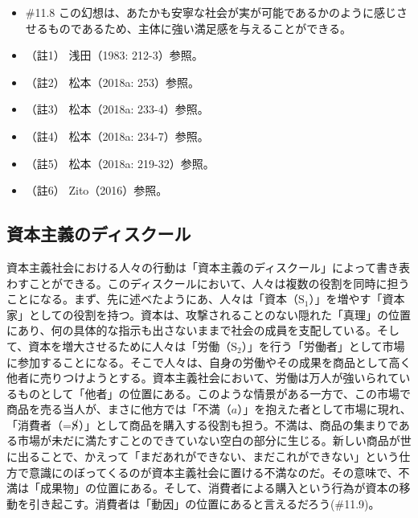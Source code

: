 \begin{note}{}
  \begin{itemize}
    \tightlist
    \item{\#11.8}
      この幻想は、あたかも安寧な社会が実が可能であるかのように感じさせるものであるため、主体に強い満足感を与えることができる。
  \end{itemize}
\end{note}

\begin{itemize}
\tightlist
\item
  （註1） 浅田（1983: 212-3）\cite{Asada}参照。
\item
  （註2） 松本（2018a: 253）\cite{Matsumoto1}参照。
\item
  （註3） 松本（2018a: 233-4）\cite{Matsumoto1}参照。
\item
  （註4） 松本（2018a: 234-7）\cite{Matsumoto1}参照。
\item
  （註5） 松本（2018a: 219-32）\cite{Matsumoto1}参照。
\item
  （註6） Zito（2016）\cite{Zito}参照。
\end{itemize}

\subsection{資本主義のディスクール}\label{ux8cc7ux672cux4e3bux7fa9ux306eux30c7ux30a3ux30b9ux30afux30fcux30eb}

資本主義社会における人々の行動は「\mbox{資本主義のディスクール}」によって書き表わすことができる。このディスクールにおいて、人々は複数の役割を同時に担うことになる。まず、先に述べたようにあ、人々は「資本（\(\textrm{S}_1\)）」を増やす「資本家」としての役割を持つ。資本は、攻撃されることのない隠れた「真理」の位置にあり、何の具体的な指示も出さないままで社会の成員を支配している。そして、資本を増大させるために人々は「労働（\(\textrm{S}_2\)）」を行う「労働者」として市場に参加することになる。そこで人々は、自身の労働やその成果を商品として高く他者に売りつけようとする。資本主義社会において、労働は万人が強いられているものとして「他者」の位置にある。このような情景がある一方で、この市場で商品を売る当人が、まさに他方では「不満（\(a\)）」を抱えた者として市場に現れ、「消費者（=\(\cancel{\textrm{S}}\)）」として商品を購入する役割も担う。不満は、商品の集まりである市場が未だに満たすことのできていない空白の部分に生じる。新しい商品が世に出ることで、かえって「まだあれができない、まだこれができない」という仕方で意識にのぼってくるのが資本主義社会に置ける不満なのだ。その意味で、不満は「成果物」の位置にある。そして、消費者による購入という行為が資本の移動を引き起こす。消費者は「動因」の位置にあると言えるだろう(\#11.9)。

